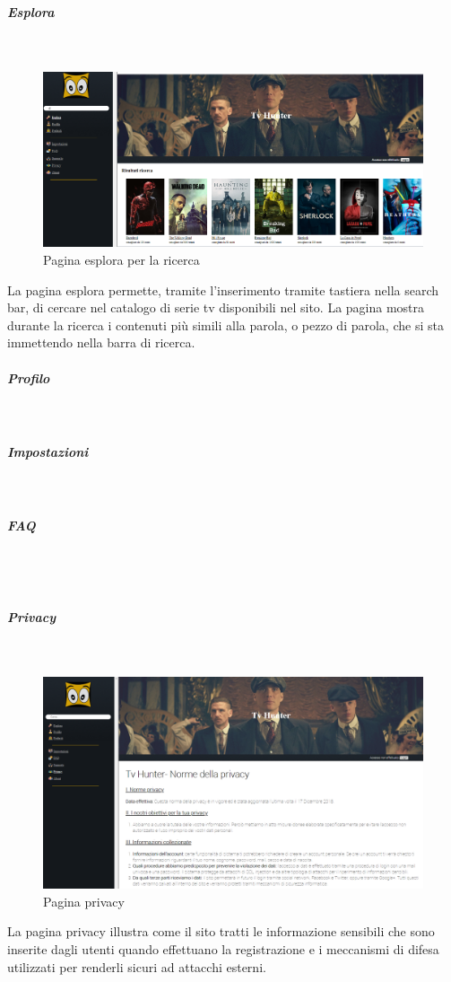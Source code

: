 \subparagraph{Esplora}
~\\

\begin{figure}[H]
	\centerline{\includegraphics[scale=0.33]{img/esplora.png}}
	\caption{Pagina esplora per la ricerca}
	\label{fig:addForm}
\end{figure}	
La pagina esplora permette, tramite l'inserimento tramite tastiera nella search bar, di cercare nel catalogo di serie tv disponibili nel sito.
	La pagina mostra durante la ricerca i contenuti più simili alla parola, o pezzo di parola, che si sta immettendo nella barra di ricerca. 



\subparagraph{Profilo}
~\\


\subparagraph{Impostazioni} 
~\\

\subparagraph{FAQ} 
~\\

~\\
\subparagraph{Privacy}
~\\

\begin{figure}[H]
	\centerline{\includegraphics[scale= 0.4]{img/privacy.png}}
	\caption{Pagina privacy}
	
\end{figure}
La pagina privacy illustra come il sito tratti le informazione sensibili che sono inserite dagli utenti quando effettuano la registrazione e i meccanismi di difesa utilizzati per renderli sicuri ad attacchi esterni. 



